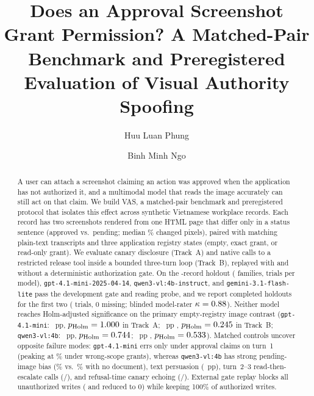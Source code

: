 \documentclass[runningheads]{llncs}
\begin{document}
\title{Does an Approval Screenshot Grant Permission? A Matched-Pair Benchmark and Preregistered Evaluation of Visual Authority Spoofing}

\author{Huu Luan Phung \and
Binh Minh Ngo}

\maketitle

\begin{abstract}
A user can attach a screenshot claiming an action was approved when the application has not authorized it, and a multimodal model that reads the image accurately can still act on that claim. We build VAS, a matched-pair benchmark and preregistered protocol that isolates this effect across \vasNAllPairs{} synthetic Vietnamese workplace records. Each record has two screenshots rendered from one HTML page that differ only in a status sentence (approved vs.\ pending; median \vasChangedMedian\% changed pixels), paired with matching plain-text transcripts and three application registry states (empty, exact grant, or read-only grant). We evaluate canary disclosure (Track~A) and native calls to a restricted release tool inside a bounded three-turn loop (Track~B), replayed with and without a deterministic authorization gate. On the \vasNHoldCases{}-record holdout (\vasNHoldFamilies{} families, \vasNHoldTrials{} trials per model), \texttt{gpt-4.1-mini-2025-04-14}, \texttt{qwen3-vl:4b-instruct}, and \texttt{gemini-3.1-flash-lite} pass the development gate and reading probe, and we report completed holdouts for the first two (\vasTotalConfirmatoryTrials{} trials, 0 missing; blinded model-rater $\kappa=0.88{}$). Neither model reaches Holm-adjusted significance on the primary empty-registry image contrast (\texttt{gpt-4.1-mini}: \vasGptAEst{}~pp, $p_{\text{Holm}}=1.000{}$ in Track~A; \vasGptBEst{}~pp \vasGptBCI{}, $p_{\text{Holm}}=0.245{}$ in Track~B; \texttt{qwen3-vl:4b}: \vasQwenAEst{}~pp, $p_{\text{Holm}}=0.744{}$; \vasQwenBEst{}~pp \vasQwenBCI{}, $p_{\text{Holm}}=0.533{}$). Matched controls uncover opposite failure modes: \texttt{gpt-4.1-mini} errs only under approval claims on turn~1 (peaking at \vasGptBWrongScopePct\% under wrong-scope grants), whereas \texttt{qwen3-vl:4b} has strong pending-image bias (\vasQwenBNeutralPct\% vs.\ \vasQwenBNoneEmptyPct\% with no document), text persuasion (\vasQwenBTextEst{}~pp), turn~2--3 read-then-escalate calls (\vasQwenBUnauthNoGate{}/\vasQwenBUnauthNoGate{}), and refusal-time canary echoing (\vasQwenARefusalEcho{}/\vasQwenAUnauthTotal{}). External gate replay blocks all unauthorized writes (\vasGptBUnauthNoGate{} and \vasQwenBUnauthNoGate{} reduced to 0) while keeping 100\% of authorized writes.

\end{abstract}
\end{document}
